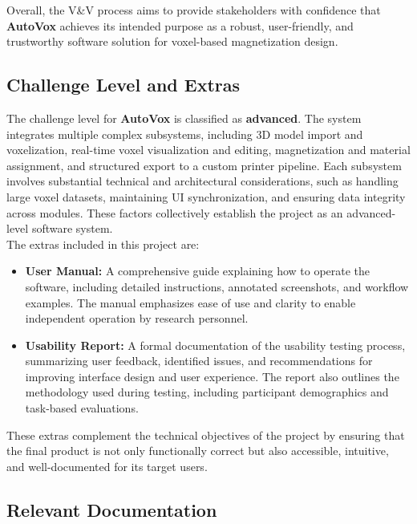 \documentclass[12pt, titlepage]{article}
\begin{document}
\noindent Overall, the V\&V process aims to provide stakeholders with confidence that \textbf{AutoVox} achieves its intended purpose as a robust, user-friendly, and trustworthy software solution for voxel-based magnetization design.\\

\subsection{Challenge Level and Extras}

\noindent The challenge level for \textbf{AutoVox} is classified as \textbf{advanced}. The system integrates multiple complex subsystems, including 3D model import and voxelization, real-time voxel visualization and editing, magnetization and material assignment, and structured export to a custom printer pipeline. Each subsystem involves substantial technical and architectural considerations, such as handling large voxel datasets, maintaining UI synchronization, and ensuring data integrity across modules. These factors collectively establish the project as an advanced-level software system.\\

\noindent The extras included in this project are:

\begin{itemize}
  \item \textbf{User Manual:} A comprehensive guide explaining how to operate the software, including detailed instructions, annotated screenshots, and workflow examples. The manual emphasizes ease of use and clarity to enable independent operation by research personnel.
  \item \textbf{Usability Report:} A formal documentation of the usability testing process, summarizing user feedback, identified issues, and recommendations for improving interface design and user experience. The report also outlines the methodology used during testing, including participant demographics and task-based evaluations.
\end{itemize}

\noindent These extras complement the technical objectives of the project by ensuring that the final product is not only functionally correct but also accessible, intuitive, and well-documented for its target users.\\

\subsection{Relevant Documentation}
\end{document}
